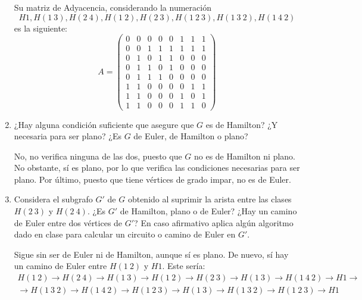 \begin{ejercicio}
\begin{enumerate}
        Su matriz de Adyacencia, considerando la numeración
        $$H1, H(1\ 3), H(2\ 4), H(1\ 2), H(2\ 3), H(1\ 2\ 3), H(1\ 3\ 2), H(1\ 4\ 2)$$ es la siguiente:
        \[
            A=\begin{pmatrix}
                0 & 0 & 0 & 0 & 0 & 1 & 1 & 1 \\
                0 & 0 & 1 & 1 & 1 & 1 & 1 & 1 \\
                0 & 1 & 0 & 1 & 1 & 0 & 0 & 0 \\
                0 & 1 & 1 & 0 & 1 & 0 & 0 & 0 \\
                0 & 1 & 1 & 1 & 0 & 0 & 0 & 0 \\
                1 & 1 & 0 & 0 & 0 & 0 & 1 & 1 \\
                1 & 1 & 0 & 0 & 0 & 1 & 0 & 1 \\
                1 & 1 & 0 & 0 & 0 & 1 & 1 & 0
            \end{pmatrix}
        \]


        \item ¿Hay alguna condición suficiente que asegure que $G$ es de Hamilton? ¿Y necesaria para ser plano? ¿Es $G$ de Euler, de Hamilton o plano?
        
        No, no verifica ninguna de las dos, puesto que $G$ no es de Hamilton ni plano. No obstante, sí es plano, por lo que verifica las condiciones necesarias para ser plano. Por último, puesto que tiene vértices de grado impar, no es de Euler.
        \item Considera el subgrafo $G'$ de $G$ obtenido al suprimir la arista entre las clases $H(2\ 3)$ y $H(2\ 4)$. ¿Es $G'$ de Hamilton, plano o de Euler? ¿Hay un camino de Euler entre dos vértices de $G'$? En caso afirmativo aplica algún algoritmo dado en clase para calcular un circuito o camino de Euler en $G'$.
        
        Sigue sin ser de Euler ni de Hamilton, aunque sí es plano. De nuevo, sí hay un camino de Euler entre $H(1\ 2)$ y $H1$. Este sería:
        \begin{multline*}
            H(1\ 2)\to H(2\ 4)\to H(1\ 3)\to H(1\ 2)\to H(2\ 3)\to H(1\ 3)\to H(1\ 4\ 2)\to H1\to\\
            \to H(1\ 3\ 2)\to H(1\ 4\ 2)\to H(1\ 2\ 3)\to H(1\ 3)\to H(1\ 3\ 2)\to H(1\ 2\ 3)\to H1
        \end{multline*}
    \end{enumerate}
\end{ejercicio}
